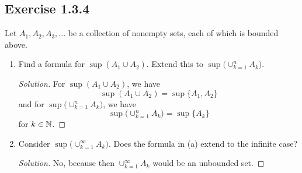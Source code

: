 \subsection{Exercise 1.3.4}
Let \( A_1, A_2, A_3,... \) be a collection of nonempty sets, each of which is bounded above. 

\begin{enumerate}
    \item Find a formula for \( \sup (A_1 \cup A_2 )\). Extend this to \( \sup \big( \cup_{k=1 }^{n} A_k \big)\). 
    \begin{proof}[Solution]
        For \( \sup (A_1 \cup A_2 )\), we have \[ \sup (A_1 \cup A_2 ) = \sup\{ A_1, A_2 \}\] and for  
        \( \sup \big( \cup_{k=1 }^{n} A_k \big)\), we have 
        \[ \sup \big( \cup_{k=1 }^{n} A_k\big) = \sup\{ A_k \} \]
        for \( k \in \mathbb{N} \). 
    \end{proof}
    \item Consider \( \sup \big( \cup_{k=1 }^{\infty} A_k\big) \). Does the formula in (a)  extend to the infinite case? 
    \begin{proof}[Solution]
        No, because then \( \cup_{k=1 }^{\infty} A_k  \) would be an unbounded set. 
    \end{proof}
\end{enumerate}



